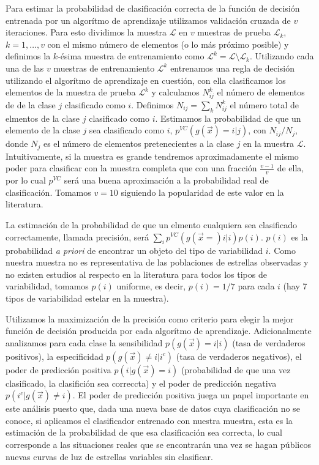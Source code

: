 \documentclass[letterpaper,12pt]{book}
\begin{document}
Para estimar la probabilidad de clasificación correcta de la función de decisión entrenada por un algorítmo de aprendizaje utilizamos validación cruzada de $v$ iteraciones. Para esto dividimos la muestra $\mathcal{L}$ en $v$ muestras de prueba $\mathcal{L}_{k}$, $k=1,\dots,v$ con el mismo número de elementos (o lo más próximo posible) y definimos la $k$-ésima muestra de entrenamiento como $\mathcal{L}^{k} = \mathcal{L}\setminus \mathcal{L}_{k}$. Utilizando cada una de las $v$ muestras de entrenamiento $\mathcal{L}^{k}$  entrenamos una regla de decisión utilizando el algorítmo de aprendizaje en cuestión, con ella clasificamos los elementos de la muestra de prueba $\mathcal{L}^{k}$ y calculamos $N_{ij}^{k}$ el número de elementos de de la clase $j$ clasificado como $i$. Definimos $N_{ij}=\sum_{k}N_{ij}^{k}$ el número total de elmentos de la clase $j$ clasificado como $i$. Estimamos la probabilidad de que un elemento de la clase $j$ sea clasificado como $i$, $p^{VC}(g(\vec{x})=i|j)$, con $N_{ij}/N_{j}$, donde $N_{j}$ es el número de elementos pretenecientes a la clase $j$ en la muestra $\mathcal{L}$. Intuitivamente, si la muestra es grande tendremos aproximadamente el mismo poder para clasificar con la muestra completa que con una fracción $\frac{v-1}{v}$ de ella, por lo cual $p^{VC}$ será una buena aproximación a la probabilidad real de clasificación. Tomamos $v=10$ siguiendo la popularidad de este valor en la literatura. 

La estimación de la probabilidad de que un elmento cualquiera sea clasificado correctamente, llamada precisión,  será $\sum_{i}p^{VC}(g(\vec{x}=)i|i)p(i)$. $p(i)$ es la probabilidad \textit{a priori} de encontrar un objeto del tipo de variabilidad $i$. Como nuestra muestra no es representativa de las poblaciones de estrellas observadas y no existen estudios al respecto en la literatura para todos los tipos de variabilidad, tomamos $p(i)$ uniforme, es decir, $p(i) = 1/7$ para cada $i$ (hay 7 tipos de variabilidad estelar en la muestra).

Utilizamos la maximización de la precisión como criterio para elegir la mejor función de decisión producida por cada algorítmo de aprendizaje. Adicionalmente analizamos para cada clase la sensibilidad $p(g(\vec{x})=i|i)$ (tasa de verdaderos positivos),  la especificidad $p(g(\vec{x})\neq i|i^c)$ (tasa de verdaderos negativos), el poder de predicción positiva $p(i|g(\vec{x})=i)$ (probabilidad de que una vez clasificado, la clasifición sea correccta) y el poder de predicción negativa $p(i^c|g(\vec{x})\neq i)$. El poder de predicción positiva juega un papel importante en este análisis puesto que, dada una nueva base de datos cuya clasificación no se conoce, si aplicamos el clasificador entrenado con nuestra muestra, esta es la estimación de la probabilidad de que esa clasificación sea correcta, lo cual corresponde a las situaciones reales que se encontrarán una vez se hagan públicos nuevas curvas de luz de estrellas variables sin clasificar. 
\end{document}
